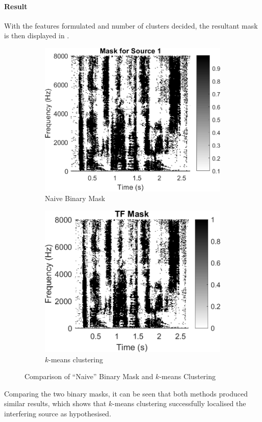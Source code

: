 \documentclass[a4paper,twoside,12pt,hidelinks]{article}
\begin{document}
\paragraph{Result}
With the features formulated and number of clusters decided, the resultant mask is then displayed in .
\begin{figure}[H]
\centering
\begin{subfigure}[H]{0.49\textwidth}
\includegraphics[width=\textwidth]{naivemask1}
\caption{Naive Binary Mask}
\end{subfigure}
\begin{subfigure}[H]{0.49\textwidth}
\includegraphics[width=\textwidth]{maskkmeans}
\caption{$k$-means clustering}
\end{subfigure}
\caption{Comparison of ``Naive'' Binary Mask and $k$-means Clustering}
\label{fig:maskkmeans}
\end{figure}
Comparing the two binary masks, it can be seen that both methods produced similar results, which shows that $k$-means clustering successfully localised the interfering source as hypothesised.
\end{document}
